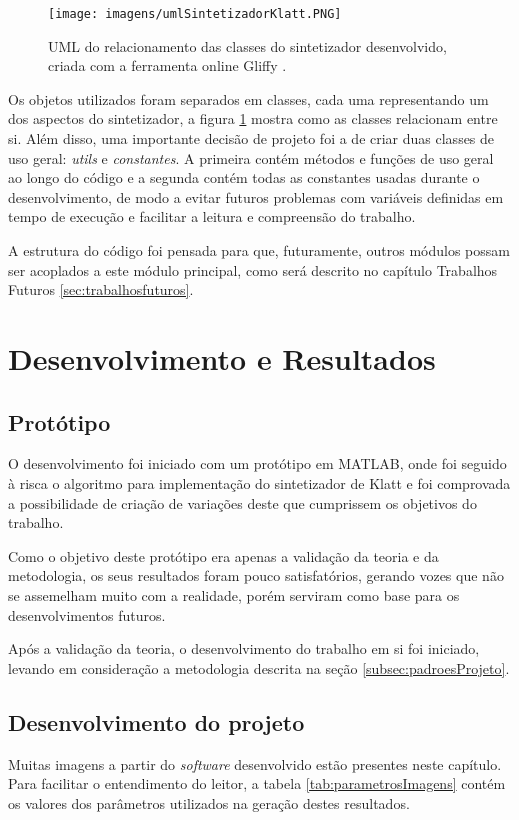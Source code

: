 \documentclass[
  12pt,       
  openright,      
  twoside,      
  a4paper,      
  english,      
  french,       
  spanish,      
  brazil,     
  ]{abntex2}
\begin{document}
\begin{figure}
\texttt{[image: imagens/umlSintetizadorKlatt.PNG]}
\caption{UML do relacionamento das classes do sintetizador desenvolvido, criada com a ferramenta online Gliffy \cite{gliffy}.}
\label{fig:umlsintetizador}
\end{figure}

Os objetos utilizados foram separados em classes, cada uma representando um dos aspectos do sintetizador, a figura \ref{fig:umlsintetizador} mostra como as classes relacionam entre si. Além disso, uma importante decisão de projeto foi a de criar duas classes de uso geral: \textit{utils} e \textit{constantes}. A primeira contém métodos e funções de uso geral ao longo do código e a segunda contém todas as constantes usadas durante o desenvolvimento, de modo a evitar futuros problemas com variáveis definidas em tempo de execução e facilitar a leitura e compreensão do trabalho.

A estrutura do código foi pensada para que, futuramente, outros módulos possam ser acoplados a este módulo principal, como será descrito no capítulo Trabalhos Futuros \ref{sec:trabalhosfuturos}.

\chapter{Desenvolvimento e Resultados}
\section{Protótipo}
O desenvolvimento foi iniciado com um protótipo em MATLAB, onde foi seguido à risca o algoritmo para implementação do sintetizador de Klatt e foi comprovada a possibilidade de criação de variações deste que cumprissem os objetivos do trabalho.

Como o objetivo deste protótipo era apenas a validação da teoria e da metodologia, os seus resultados foram pouco satisfatórios, gerando vozes que não se assemelham muito com a realidade, porém serviram como base para os desenvolvimentos futuros.

Após a validação da teoria, o desenvolvimento do trabalho em si foi iniciado, levando em consideração a metodologia descrita na seção \ref{subsec:padroesProjeto}.

\section{Desenvolvimento do projeto}
Muitas imagens a partir do \textit{software} desenvolvido estão presentes neste capítulo. Para facilitar o entendimento do leitor, a tabela \ref{tab:parametrosImagens} contém os valores dos parâmetros utilizados na geração destes resultados.
\end{document}
